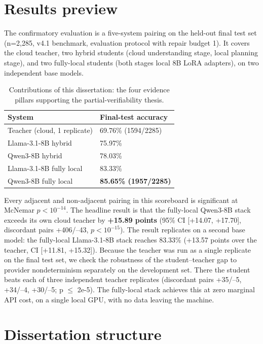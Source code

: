 \section{Results preview}\label{sec:results-preview}

The confirmatory evaluation is a five-system pairing on the held-out final test set (n=2,285, v4.1 benchmark, evaluation protocol with repair budget 1). It covers the cloud teacher, two hybrid students (cloud understanding stage, local planning stage), and two fully-local students (both stages local 8B LoRA adapters), on two independent base models.

\begin{table}[t]
\centering
\small
\caption{Contributions of this dissertation: the four evidence pillars supporting the partial-verifiability thesis.}
\label{tab:01_introduction_1}
\begin{tabular}{ll}
\toprule
System & Final-test accuracy \\
\midrule
Teacher (cloud, 1 replicate) & 69.76\% (1594/2285) \\
Llama-3.1-8B hybrid & 75.97\% \\
Qwen3-8B hybrid & 78.03\% \\
Llama-3.1-8B fully local & 83.33\% \\
Qwen3-8B fully local & \textbf{85.65\% (1957/2285)} \\
\bottomrule
\end{tabular}
\end{table}


Every adjacent and non-adjacent pairing in this scoreboard is significant at McNemar $p<10^{-14}$. The headline result is that the fully-local Qwen3-8B stack exceeds its own cloud teacher by \textbf{+15.89 points} (95\% CI [+14.07, +17.70], discordant pairs +406/--43, $p<10^{-15}$). The result replicates on a second base model: the fully-local Llama-3.1-8B stack reaches 83.33\% (+13.57 points over the teacher, CI [+11.81, +15.32]). Because the teacher was run as a single replicate on the final test set, we check the robustness of the student--teacher gap to provider nondeterminism separately on the development set. There the student beats each of three independent teacher replicates (discordant pairs +35/--5, +34/--4, +30/--5; p $\leq$ 2e-5). The fully-local stack achieves this at zero marginal API cost, on a single local GPU, with no data leaving the machine.

\section{Dissertation structure}\label{sec:dissertation-structure}

